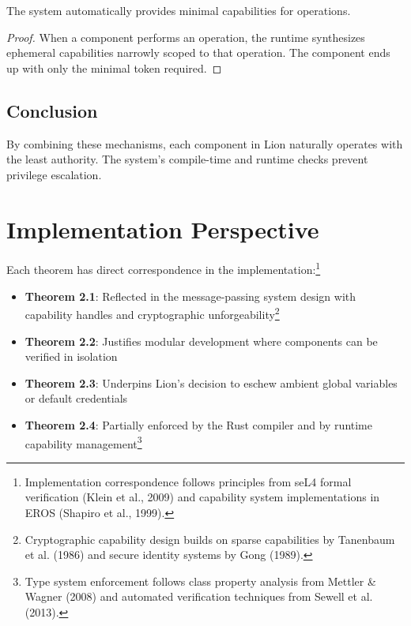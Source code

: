 \begin{lemma}
The system automatically provides minimal capabilities for operations.
\end{lemma}

\begin{proof}
When a component performs an operation, the runtime synthesizes ephemeral capabilities narrowly scoped to that operation. The component ends up with only the minimal token required.
\end{proof}

\subsection{Conclusion}

By combining these mechanisms, each component in Lion naturally operates with the least authority. The system's compile-time and runtime checks prevent privilege escalation.

\newpage

\section{Implementation Perspective}

Each theorem has direct correspondence in the implementation:\footnote{Implementation correspondence follows principles from seL4 formal verification (Klein et al., 2009) and capability system implementations in EROS (Shapiro et al., 1999).}

\begin{itemize}
\item \textbf{Theorem 2.1}: Reflected in the message-passing system design with capability handles and cryptographic unforgeability\footnote{Cryptographic capability design builds on sparse capabilities by Tanenbaum et al. (1986) and secure identity systems by Gong (1989).}
\item \textbf{Theorem 2.2}: Justifies modular development where components can be verified in isolation
\item \textbf{Theorem 2.3}: Underpins Lion's decision to eschew ambient global variables or default credentials
\item \textbf{Theorem 2.4}: Partially enforced by the Rust compiler and by runtime capability management\footnote{Type system enforcement follows class property analysis from Mettler \& Wagner (2008) and automated verification techniques from Sewell et al. (2013).}
\end{itemize}

